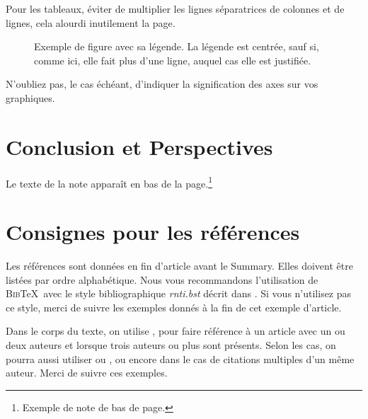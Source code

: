 \documentclass[a4paper,pagenum,french,showlayout]{rnti}
\begin{document}
Pour les tableaux, éviter de multiplier les lignes séparatrices de
colonnes et de lignes, cela alourdi inutilement la page.


\begin{figure}[t]
\begin{center}
 \caption{Exemple de figure avec sa légende. La légende est centrée,
sauf si, comme ici, elle fait plus d'une ligne, auquel cas elle est
justifiée.} \label{fig_exemple}
\end{center}
\end{figure}

N'oubliez pas, le cas échéant, d'indiquer la signification des axes
sur vos graphiques.


\section{Conclusion et Perspectives}

Le texte de la note apparaît en bas de la page.\footnote{Exemple de
note de bas de page.}




\section{Consignes pour les références}

Les références sont données en fin d'article avant le
\guilo{}Summary\guilf{}. Elles doivent être listées par ordre
alphabétique.  Nous vous recommandons l'utilisation de
\textsc{Bib}\TeX\ avec le style bibliographique \textit{rnti.bst}
décrit dans \citet{ritschard:2005rnti}. Si vous n'utilisez pas ce
style, merci de suivre les exemples donnés à la fin de cet exemple
d'article.

Dans le corps du texte, on utilise \citet{thSau00}, \citet{HolWil90}
pour faire référence à un article avec un ou deux auteurs et
\citet{lioni01} lorsque trois auteurs ou plus sont présents.  Selon
les cas, on pourra aussi utiliser \citep{thSau00} ou
\citep[voir][chapitre 4]{brei:frie:olsh:ston:1984}, ou encore
\citet{quin:1986ID3,quin:1993} dans le cas de citations multiples
d'un même auteur. Merci de suivre ces exemples.






\appendix


\Fr
\end{document}
